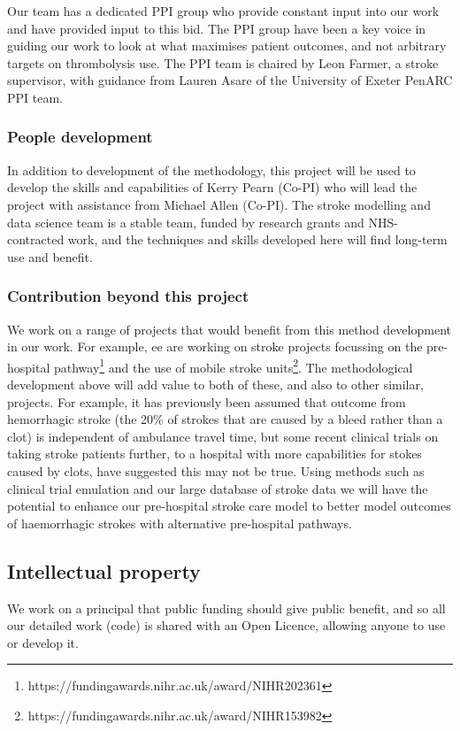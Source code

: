 Our team has a dedicated PPI group who provide constant input into our work and have provided input to this bid. The PPI group have been a key voice in guiding our work to look at what maximises patient outcomes, and not arbitrary targets on thrombolysis use. The PPI team is chaired by Leon Farmer, a stroke supervisor, with guidance from Lauren Asare of the University of Exeter PenARC PPI team.

\subsubsection{People development}

In addition to development of the methodology, this project will be used to develop the skills and capabilities of Kerry Pearn (Co-PI) who will lead the project with assistance from Michael Allen (Co-PI). The stroke modelling and data science team is a stable team, funded by research grants and NHS-contracted work, and the techniques and skills developed here will find long-term use and benefit.

\subsubsection{Contribution beyond this project}

We work on a range of projects that would benefit from this method development in our work. For example, ee are working on stroke projects focussing on the pre-hospital pathway\footnote{https://fundingawards.nihr.ac.uk/award/NIHR202361} and the use of mobile stroke units\footnote{https://fundingawards.nihr.ac.uk/award/NIHR153982}. The methodological development above will add value to both of these, and also to other similar, projects. For example, it has previously been assumed that outcome from hemorrhagic stroke (the 20\% of strokes that are caused by a bleed rather than a clot) is independent of ambulance travel time, but some recent clinical trials on taking stroke patients further, to a hospital with more capabilities for stokes caused by clots, have suggested this may not be true. Using methods such as clinical trial emulation and our large database of stroke data we will have the potential to enhance our pre-hospital stroke care model to better model outcomes of haemorrhagic strokes with alternative pre-hospital pathways.

\subsection{Intellectual property}

We work on a principal that public funding should give public benefit, and so all our detailed work (code) is shared with an Open Licence, allowing anyone to use or develop it.
